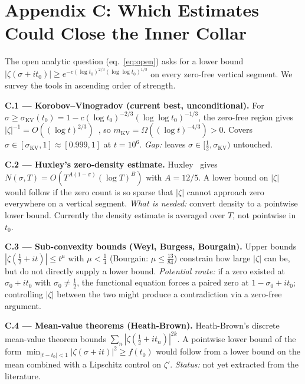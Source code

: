 \documentclass[11pt]{article}
\begin{document}
\section*{Appendix C: Which Estimates Could Close the Inner Collar}

The open analytic question (eq.~\ref{eq:open}) asks for a lower bound
$|\zeta(\sigma+it_0)|\ge e^{-c(\log t_0)^{2/3}(\log\log t_0)^{1/3}}$
on every zero-free vertical segment.
We survey the tools in ascending order of strength.

\medskip\noindent\textbf{C.1 — Korobov--Vinogradov (current best, unconditional).}
For $\sigma\ge\sigma_{\mathrm{KV}}(t_0)=1-c(\log t_0)^{-2/3}(\log\log t_0)^{-1/3}$,
the zero-free region gives $|\zeta|^{-1}=O((\log t)^{2/3})$~\cite{ford},
so $m_{\mathrm{KV}}=\Omega((\log t)^{-4/3})>0$.
Covers $\sigma\in[\sigma_{\mathrm{KV}},1]\approx[0.999,1]$ at $t=10^6$.
\emph{Gap:} leaves $\sigma\in[\tfrac12,\sigma_{\mathrm{KV}})$ untouched.

\medskip\noindent\textbf{C.2 — Huxley's zero-density estimate.}
Huxley~\cite{huxley} gives $N(\sigma,T)=O(T^{A(1-\sigma)}(\log T)^B)$
with $A=12/5$.
A lower bound on $|\zeta|$ would follow if the zero count is so sparse
that $|\zeta|$ cannot approach zero everywhere on a vertical segment.
\emph{What is needed:} convert density to a pointwise lower bound.
Currently the density estimate is averaged over $T$, not pointwise in $t_0$.

\medskip\noindent\textbf{C.3 — Sub-convexity bounds (Weyl, Burgess, Bourgain).}
Upper bounds $|\zeta(\tfrac12+it)|\le t^\mu$ with $\mu<\tfrac14$ (Bourgain:
$\mu\le\tfrac{13}{84}$) constrain how large $|\zeta|$ can be,
but do not directly supply a lower bound.
\emph{Potential route:} if a zero existed at $\sigma_0+it_0$ with
$\sigma_0\ne\tfrac12$, the functional equation forces a paired zero at
$1-\sigma_0+it_0$; controlling $|\zeta|$ between the two might produce a
contradiction via a zero-free argument.

\medskip\noindent\textbf{C.4 — Mean-value theorems (Heath-Brown).}
Heath-Brown's discrete mean-value theorem bounds
$\sum_n|\zeta(\tfrac12+it_n)|^{2k}$.
A pointwise lower bound of the form
$\min_{|t-t_0|<1}|\zeta(\sigma+it)|^2\ge f(t_0)$
would follow from a lower bound on the mean combined with a Lipschitz
control on $\zeta'$.  \emph{Status:} not yet extracted from the literature.
\end{document}
